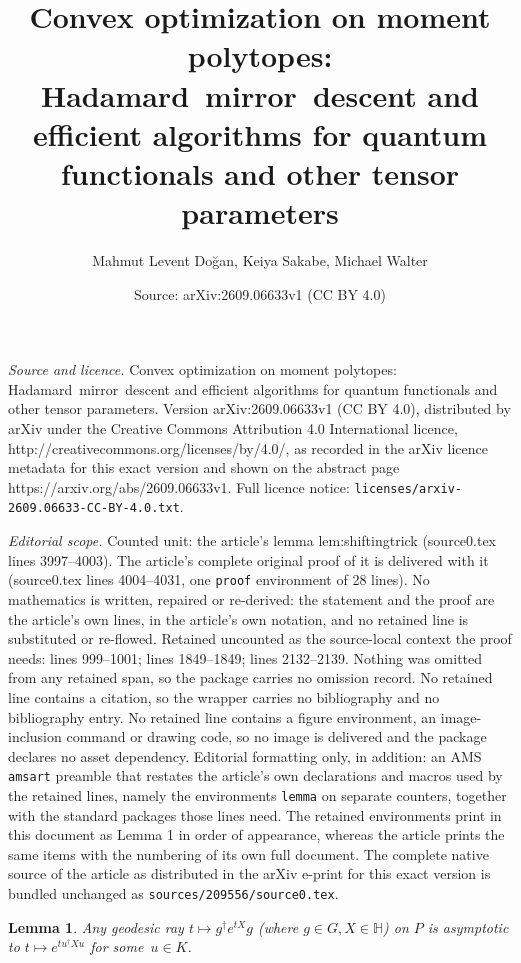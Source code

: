 \documentclass[10pt,a4paper]{amsart}
\title{Convex optimization on moment polytopes: Hadamard~mirror~descent and efficient algorithms for quantum functionals and other tensor parameters}
\author{Mahmut Levent Do\u{g}an, Keiya Sakabe, Michael Walter}
\date{Source: arXiv:2609.06633v1 (CC BY 4.0)}
\newtheorem{lemma}{Lemma}
\newcommand{\bbH}{\mathbb{H}}
\begin{document}
\maketitle

\noindent\emph{Source and licence.} Convex optimization on moment polytopes: Hadamard~mirror~descent and efficient algorithms for quantum functionals and other tensor parameters. Version arXiv:2609.06633v1 (CC BY 4.0), distributed by arXiv under the Creative Commons Attribution 4.0 International licence, http://creativecommons.org/licenses/by/4.0/, as recorded in the arXiv licence metadata for this exact version and shown on the abstract page https://arxiv.org/abs/2609.06633v1. Full licence notice: \texttt{licenses/arxiv-2609.06633-CC-BY-4.0.txt}.\par\smallskip

\noindent\textit{Editorial scope.} Counted unit: the article's lemma lem:shiftingtrick (source0.tex lines 3997--4003). The article's complete original proof of it is delivered with it (source0.tex lines 4004--4031, one \texttt{proof} environment of 28 lines). No mathematics is written, repaired or re-derived: the statement and the proof are the article's own lines, in the article's own notation, and no retained line is substituted or re-flowed.  Retained uncounted as the source-local context the proof needs: lines 999--1001; lines 1849--1849; lines 2132--2139.  Nothing was omitted from any retained span, so the package carries no omission record.  No retained line contains a citation, so the wrapper carries no bibliography and no bibliography entry.  No retained line contains a figure environment, an image-inclusion command or drawing code, so no image is delivered and the package declares no asset dependency.  Editorial formatting only, in addition: an AMS \texttt{amsart} preamble that restates the article's own declarations and macros used by the retained lines, namely the environments \texttt{lemma} on separate counters, together with the standard packages those lines need.  The retained environments print in this document as Lemma 1 in order of appearance, whereas the article prints the same items with the numbering of its own full document.  The complete native source of the article as distributed in the arXiv e-print for this exact version is bundled unchanged as \texttt{sources/209556/source0.tex}.
\begin{lemma}\label{lem:asymptoticrays}
    Any geodesic ray $t \mapsto g^\dagger e^{tX}g$ (where $g \in G, X \in \bbH$) on $P$ is asymptotic to $t \mapsto e^{tu^\dagger Xu}$ for some~$u \in K$.
\end{lemma}
\end{document}
